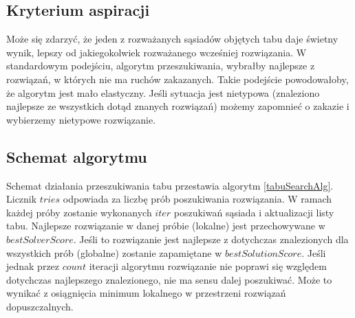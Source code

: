 \documentclass[11pt,a4paper,twoside]{article}
\begin{document}
\subsection{Kryterium aspiracji}
Może się zdarzyć, że jeden z rozważanych sąsiadów objętych tabu daje świetny wynik, lepszy od jakiegokolwiek rozważanego wcześniej rozwiązania. W standardowym podejściu, algorytm przeszukiwania, wybrałby najlepsze z rozwiązań, w których nie ma ruchów zakazanych. Takie podejście powodowałoby, że algorytm jest mało elastyczny. Jeśli sytuacja jest nietypowa (znaleziono najlepsze ze wszystkich dotąd znanych rozwiązań) możemy zapomnieć o zakazie i wybierzemy nietypowe rozwiązanie. 

\subsection{Schemat algorytmu}
Schemat działania przeszukiwania tabu przestawia algorytm \ref{tabuSearchAlg}. Licznik $tries$ odpowiada za liczbę prób poszukiwania rozwiązania. W ramach każdej próby zostanie wykonanych $iter$ poszukiwań sąsiada i aktualizacji listy tabu. Najlepsze rozwiązanie w danej próbie (lokalne) jest przechowywane w $bestSolverScore$. Jeśli to rozwiązanie jest najlepsze z dotychczas znalezionych dla wszystkich prób (globalne) zostanie zapamiętane w $bestSolutionScore$. Jeśli jednak przez $count$ iteracji algorytmu rozwiązanie nie poprawi się względem dotychczas najlepszego znalezionego, nie ma sensu dalej poszukiwać. Może to wynikać z osiągnięcia minimum lokalnego w przestrzeni rozwiązań dopuszczalnych.
\end{document}
